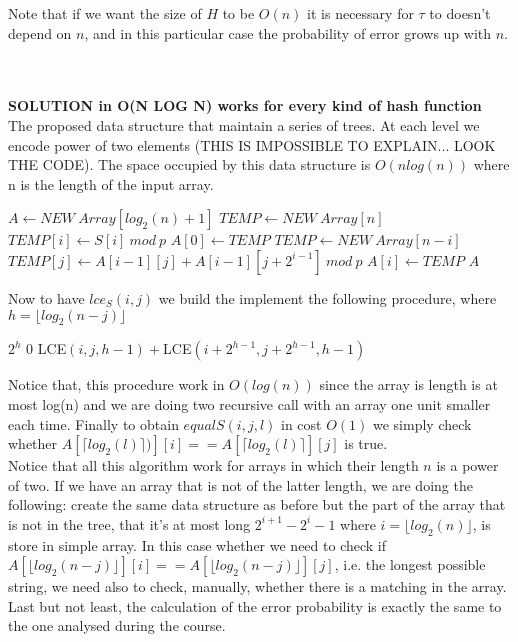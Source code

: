 \documentclass[a4paper]{article}
\begin{document}
Note that if we want the size of $H$ to be $O(n)$ it is necessary for $\tau$ to doesn't depend on $n$, and in this particular case the probability of error grows up with $n$.


\newpage \qquad \\
\\
\textbf{SOLUTION in O(N LOG N) works for every kind of hash function}
\\
The proposed data structure that maintain a series of trees. At each level we encode power of two elements (THIS IS IMPOSSIBLE TO EXPLAIN... LOOK THE CODE). The space occupied by this data structure is $O(nlog(n))$ where n is the length of the input array.   
\begin{algorithmic}
\State $A \gets NEW \ Array[log_2(n)+1]$
\State $TEMP \gets NEW \ Array[n]$
\State $TEMP[i] \gets S[i] \ mod \ p$
\EndFor 
\State $A[0] \gets TEMP$
\State $TEMP \gets NEW \ Array[n-i]$ 
\State $TEMP[j] \gets A[i-1][j] + A[i-1][j+2^{i-1}] \ mod \ p$
\EndFor 
\State $A[i] \gets TEMP$
\EndFor 
\State \Return $A$
\EndFunction
\end{algorithmic}
Now to have $lce_S(i, j)$ we build the implement the following procedure, where $h=\lfloor log_2(n-j)\rfloor$
\begin{algorithmic}
    \State \Return $2^h$
\Else
        \State \Return $0$
    \Else
    	\State \Return LCE$(i, j,h-1) +$LCE$(i+2^{h-1},j+2^{h-1},h-1)$ 
    \EndIf
\EndIf
\EndFunction
\end{algorithmic}
Notice that, this procedure work in $O(log(n))$ since the array is length is at most log(n) and we are doing two recursive call with an array one unit smaller each time. Finally to obtain $equalS(i, j,\textit{l})$ in cost $O(1)$ we simply check whether $A[\lceil log_2(l) \rceil )][i]== A[\lceil log_2(l) \rceil ][j]$ is true. \\
Notice that all this algorithm work for arrays in which their length $n$ is a power of two. If we have an array that is not of the latter length, we are doing the following: create the same data structure as before but the part of the array that is not in the tree, that it's at most long $2^{i+1}-2^{i}-1$ where $i= \lfloor log_2(n)\rfloor$, is store in simple array. In this case whether we need to check if $A[\lfloor log_2(n-j)\rfloor][i]== A[\lfloor log_2(n-j)\rfloor][j]$, i.e. the longest possible string, we need also to check, manually, whether there is a matching in the array. Last but not least, the calculation of the error probability is exactly the same to the one analysed during the course.  
\end{document}
